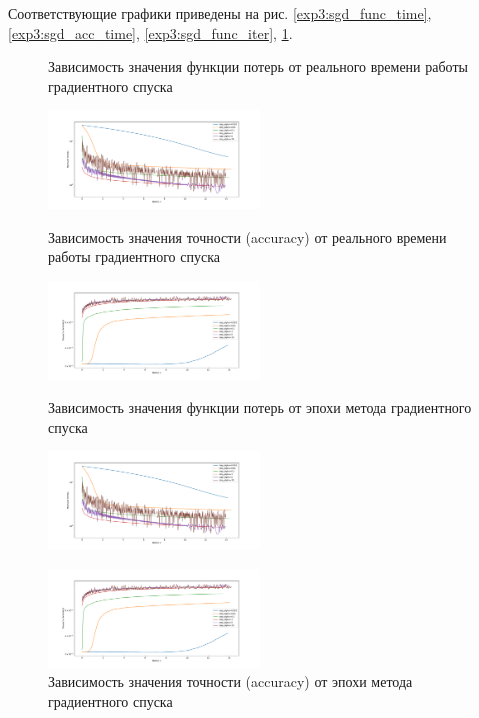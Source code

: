 \documentclass[a4paper, 11pt]{article}
\begin{document}
            Соответствующие графики приведены на рис. \ref{exp3:sgd_func_time}, \ref{exp3:sgd_acc_time}, \ref{exp3:sgd_func_iter}, \ref{exp3:sgd_acc_iter}.
            \begin{figure}[H] \label{exp1}
                \begin{multicols}{2}
                    \begin{center}
                        \caption{Зависимость значения функции потерь от реального времени работы градиентного спуска} \label{exp3:sgd_func_time}
                        \includegraphics[width=0.5\textwidth, height=0.25\textheight]{../graphs/exp1_func_GD_alpha_time_beta=0,001.pdf}
                        
                        \caption{Зависимость значения точности (accuracy) от реального времени работы градиентного спуска} \label{exp3:sgd_acc_time}
                        \includegraphics[width=0.5\textwidth, height=0.25\textheight]{../graphs/exp1_accuracy_GD_alpha_time_beta=0,001.pdf}
                        
                        \caption{Зависимость значения функции потерь от эпохи метода градиентного спуска} \label{exp3:sgd_func_iter}
                        \includegraphics[width=0.5\textwidth, height=0.25\textheight]{../graphs/exp1_func_GD_alpha_time_beta=0,001.pdf}
                        
                        \caption{Зависимость значения точности (accuracy) от эпохи метода градиентного спуска} \label{exp3:sgd_acc_iter}
                        \includegraphics[width=0.5\textwidth, height=0.25\textheight]{../graphs/exp1_accuracy_GD_alpha_time_beta=0,001.pdf}
                    \end{center}
                \end{multicols}
            \end{figure}
            
\end{document}
